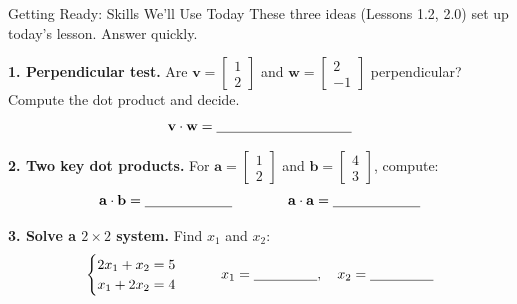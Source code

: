 \documentclass[10pt]{article}
\newcommand{\vv}{\mathbf{v}}
\newcommand{\ww}{\mathbf{w}}
\newcommand{\avec}{\mathbf{a}}
\newcommand{\bb}{\mathbf{b}}
\begin{document}
\namedateperiod

\vspace{0.12in}

\begin{notesbox}{Getting Ready: Skills We'll Use Today}
\small These three ideas (Lessons 1.2, 2.0) set up today's lesson. Answer quickly.

\vspace{4pt}
\textbf{1. Perpendicular test.} Are $\vv=\begin{bmatrix} 1 \\ 2 \end{bmatrix}$ and
$\ww=\begin{bmatrix} 2 \\ -1 \end{bmatrix}$ perpendicular? Compute the dot product and decide.
\[
  \vv\cdot\ww = \blank{3.4cm}
\]

\vspace{4pt}
\textbf{2. Two key dot products.} For $\avec=\begin{bmatrix} 1 \\ 2 \end{bmatrix}$ and
$\bb=\begin{bmatrix} 4 \\ 3 \end{bmatrix}$, compute:
\[
  \avec\cdot\bb = \blank{2.2cm} \qquad\qquad \avec\cdot\avec = \blank{2.2cm}
\]

\vspace{4pt}
\textbf{3. Solve a $2\times2$ system.} Find $x_1$ and $x_2$:
\[
  \begin{cases} 2x_1 + x_2 = 5 \\ x_1 + 2x_2 = 4 \end{cases}
  \qquad x_1 = \blank{1.6cm},\quad x_2 = \blank{1.6cm}
\]
\end{notesbox}
\end{document}
